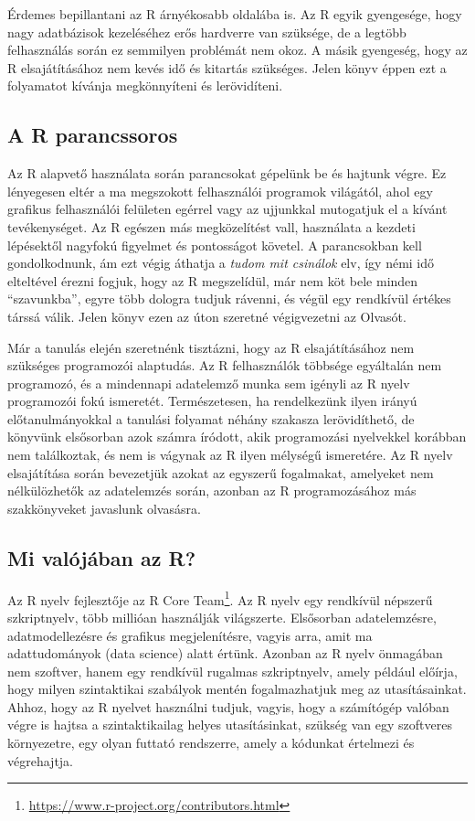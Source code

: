 \documentclass[
]{book}
\DeclareRobustCommand{\href}[2]{#2\footnote{\url{#1}}}
\begin{document}
Érdemes bepillantani az R árnyékosabb oldalába is. Az R egyik gyengesége, hogy nagy adatbázisok kezeléséhez erős hardverre van szüksége, de a legtöbb felhasználás során ez semmilyen problémát nem okoz. A másik gyengeség, hogy az R elsajátításához nem kevés idő és kitartás szükséges. Jelen könyv éppen ezt a folyamatot kívánja megkönnyíteni és lerövidíteni.

\hypertarget{a-r-parancssoros}{%
\subsection{A R parancssoros}\label{a-r-parancssoros}}

Az R alapvető használata során parancsokat gépelünk be és hajtunk végre. Ez lényegesen eltér a ma megszokott felhasználói programok világától, ahol egy grafikus felhasználói felületen egérrel vagy az ujjunkkal mutogatjuk el a kívánt tevékenységet. Az R egészen más megközelítést vall, használata a kezdeti lépésektől nagyfokú figyelmet és pontosságot követel. A parancsokban kell gondolkodnunk, ám ezt végig áthatja a \emph{tudom mit csinálok} elv, így némi idő elteltével érezni fogjuk, hogy az R megszelídül, már nem köt bele minden ``szavunkba'', egyre több dologra tudjuk rávenni, és végül egy rendkívül értékes társsá válik. Jelen könyv ezen az úton szeretné végigvezetni az Olvasót.

Már a tanulás elején szeretnénk tisztázni, hogy az R elsajátításához nem szükséges programozói alaptudás. Az R felhasználók többsége egyáltalán nem programozó, és a mindennapi adatelemző munka sem igényli az R nyelv programozói fokú ismeretét. Természetesen, ha rendelkezünk ilyen irányú előtanulmányokkal a tanulási folyamat néhány szakasza lerövidíthető, de könyvünk elsősorban azok számra íródott, akik programozási nyelvekkel korábban nem találkoztak, és nem is vágynak az R ilyen mélységű ismeretére. Az R nyelv elsajátítása során bevezetjük azokat az egyszerű fogalmakat, amelyeket nem nélkülözhetők az adatelemzés során, azonban az R programozásához más szakkönyveket javaslunk olvasásra.

\hypertarget{mi-valuxf3juxe1ban-az-r}{%
\subsection{Mi valójában az R?}\label{mi-valuxf3juxe1ban-az-r}}

Az R nyelv fejlesztője az \href{https://www.r-project.org/contributors.html}{R Core Team}. Az R nyelv egy rendkívül népszerű szkriptnyelv, több millióan használják világszerte. Elsősorban adatelemzésre, adatmodellezésre és grafikus megjelenítésre, vagyis arra, amit ma adattudományok (data science) alatt értünk. Azonban az R nyelv önmagában nem szoftver, hanem egy rendkívül rugalmas szkriptnyelv, amely például előírja, hogy milyen szintaktikai szabályok mentén fogalmazhatjuk meg az utasításainkat. Ahhoz, hogy az R nyelvet használni tudjuk, vagyis, hogy a számítógép valóban végre is hajtsa a szintaktikailag helyes utasításinkat, szükség van egy szoftveres környezetre, egy olyan futtató rendszerre, amely a kódunkat értelmezi és végrehajtja.
\end{document}
